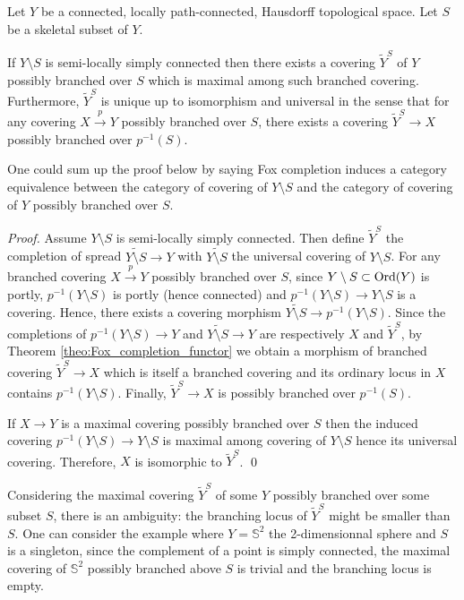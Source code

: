 \begin{prop}\label{prop:universality} Let $Y$ be a connected, locally path-connected, Hausdorff topological space.  Let $S$ be a skeletal subset of $Y$.

If $Y\setminus S$ is semi-locally simply connected then  there exists a covering $\widetilde Y^S$ of $Y$ possibly branched over $S$ which is maximal among such branched covering.
Furthermore, $\widetilde Y^S$
 is unique up to isomorphism and universal in the sense that for any covering $X\xrightarrow{p} Y$ possibly branched over $S$, there exists a covering $\widetilde Y^S\rightarrow X$ possibly branched over $p^{-1}(S)$.
\end{prop}
\begin{rem}\label{rem:one_could_sum_up}
One could sum up the proof below by saying Fox completion induces a category equivalence between the category of covering of $Y\setminus S$  and the category of covering of $Y$ possibly branched over $S$.
\end{rem}
\begin{proof} 


 Assume $Y\setminus S$ is semi-locally simply connected. Then define $\widetilde Y^S$ the completion of spread $\widetilde {Y\setminus S} \rightarrow Y$ with $\widetilde {Y\setminus S}$ the universal covering of $Y\setminus S$. For any branched covering $X\xrightarrow{p}Y$ possibly branched over $S$, since $Y\setminus S\subset \mathrm{Ord}(Y)$ is portly, $p^{-1}(Y\setminus S)$ is portly (hence connected) and $p^{-1}(Y\setminus S) \rightarrow Y\setminus S$ is a covering. Hence, there exists a covering morphism $\widetilde {Y\setminus S} \rightarrow p^{-1}(Y\setminus S) $. Since the completions of 
 $p^{-1}(Y\setminus S) \rightarrow Y$ and $\widetilde {Y\setminus S}\rightarrow Y$ are respectively $X$ and $\widetilde Y^S$, by Theorem \ref{theo:Fox_completion_functor} we obtain a morphism of branched covering 
 $\widetilde Y^S \rightarrow X$ which is itself a branched covering and its ordinary locus in $X$ contains $p^{-1}(Y\setminus S)$. Finally, $\widetilde Y^S \rightarrow X$ is possibly branched over $p^{-1}(S)$. 
 
 If $X\rightarrow Y$ is a maximal  covering possibly branched over $S$ then the induced covering $p^{-1}(Y\setminus S)\rightarrow Y\setminus S$  is maximal among covering of $Y\setminus S$ hence its universal covering. Therefore, $X$ is isomorphic to $\widetilde Y^S$.
\qed\end{proof}
\begin{rem}\label{rem:considering_maximal_covering_possibly}
 Considering the maximal covering $\widetilde Y^S$ of some $Y$ possibly branched over some subset $S$, there is an ambiguity: the branching locus of $\widetilde Y^S$ might be smaller than $S$. One can consider the example where $Y=\mathbb S^2$ the 2-dimensionnal sphere and $S$ is a singleton, since the complement of a point is simply connected, the maximal covering of $\mathbb S^2$ possibly branched above $S$ is trivial and the branching locus is empty. 
 \end{rem}


